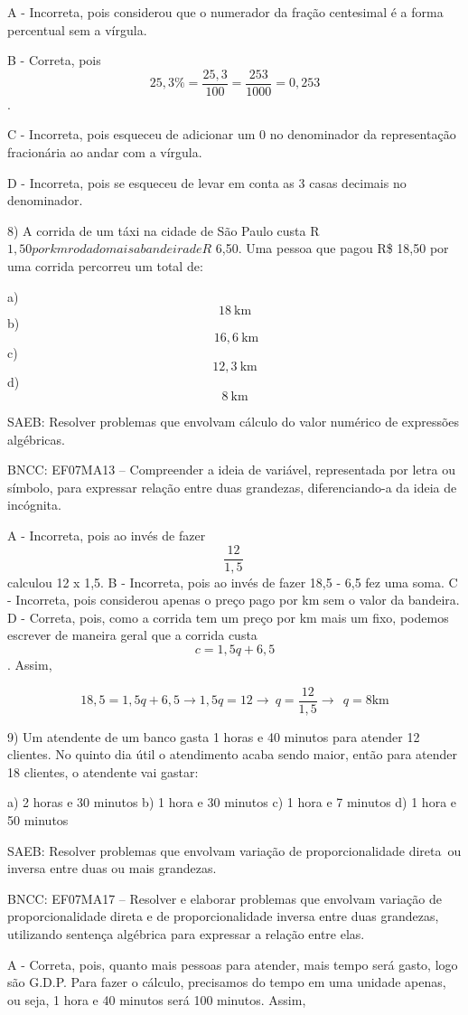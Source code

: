 A - Incorreta, pois considerou que o numerador da fração centesimal é a
forma percentual sem a vírgula.

B - Correta, pois
\[25,3\% = \frac{25,3}{100} = \frac{253}{1000} = 0,253\].

C - Incorreta, pois esqueceu de adicionar um 0 no denominador da
representação fracionária ao andar com a vírgula.

D - Incorreta, pois se esqueceu de levar em conta as 3 casas decimais no
denominador.

8) A corrida de um táxi na cidade de São Paulo custa
R\(1,50 por km rodado mais a bandeira de R\) 6,50. Uma pessoa que pagou
R\$ 18,50 por uma corrida percorreu um total de:

a) \[18\ \text{km}\] b) \[\ 16,6\ \text{km}\] c) \[12,3\ \text{km}\] d)
\[8\ \text{km}\]

SAEB: Resolver problemas que envolvam cálculo do valor numérico de
expressões algébricas.

BNCC: EF07MA13 -- Compreender a ideia de variável, representada por
letra ou símbolo, para expressar relação entre duas grandezas,
diferenciando-a da ideia de incógnita.

A - Incorreta, pois ao invés de fazer \[\frac{12}{1,5}\ \]calculou 12 x
1,5. B - Incorreta, pois ao invés de fazer 18,5 - 6,5 fez uma soma. C -
Incorreta, pois considerou apenas o preço pago por km sem o valor da
bandeira. D - Correta, pois, como a corrida tem um preço por km mais um
fixo, podemos escrever de maneira geral que a corrida custa
\[c = 1,5q + 6,5\]. Assim,

\[18,5 = 1,5q + 6,5 \rightarrow 1,5q = 12 \rightarrow \ q = \frac{12}{1,5} \rightarrow \ \ q = 8\text{km}\]

9) Um atendente de um banco gasta 1 horas e 40 minutos para atender 12
clientes. No quinto dia útil o atendimento acaba sendo maior, então para
atender 18 clientes, o atendente vai gastar:

a) 2 horas e 30 minutos b) 1 hora e 30 minutos c) 1 hora e 7 minutos d)
1 hora e 50 minutos

SAEB: Resolver problemas que envolvam variação de proporcionalidade
direta~ou inversa entre duas ou mais grandezas.

BNCC: EF07MA17 -- Resolver e elaborar problemas que envolvam variação de
proporcionalidade direta e de proporcionalidade inversa entre duas
grandezas, utilizando sentença algébrica para expressar a relação entre
elas.

A - Correta, pois, quanto mais pessoas para atender, mais tempo será
gasto, logo são G.D.P. Para fazer o cálculo, precisamos do tempo em uma
unidade apenas, ou seja, 1 hora e 40 minutos será 100 minutos. Assim,

